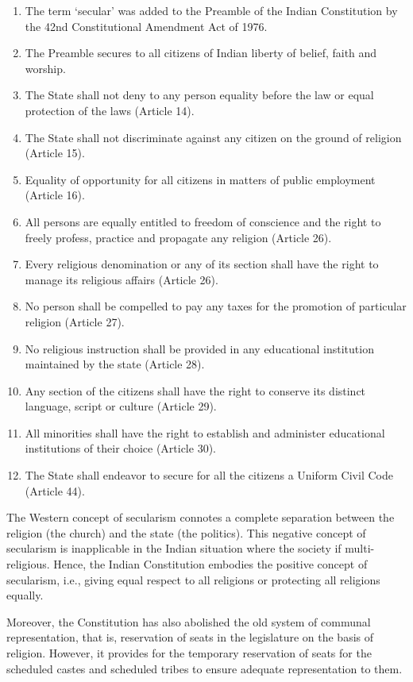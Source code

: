 \renewcommand{\labelenumi}{\textbf{(\alph{enumi})}}
\begin{enumerate}
  \item The term `secular' was added to the Preamble of the Indian Constitution by the 42nd Constitutional Amendment Act of 1976.
  \item The Preamble secures to all citizens of Indian liberty of belief, faith and worship.
  \item The State shall not deny to any person equality before the law or equal protection of the laws (Article 14).
  \item The State shall not discriminate against any citizen on the ground of religion (Article 15).
  \item Equality of opportunity for all citizens in matters of public employment (Article 16).
  \item All persons are equally entitled to freedom of conscience and the right to freely profess, practice and propagate any religion (Article 26).
  \item Every religious denomination or any of its section shall have the right to manage its religious affairs (Article 26).
  \item No person shall be compelled to pay any taxes for the promotion of particular religion (Article 27).
  \item No religious instruction shall be provided in any educational institution maintained by the state (Article 28).
  \item Any section of the citizens shall have the right to conserve its distinct language, script or culture (Article 29).
  \item All minorities shall have the right to establish and administer educational institutions of their choice (Article 30).
  \item The State shall endeavor to secure for all the citizens a Uniform Civil Code (Article 44).
\end{enumerate}

The Western concept of secularism connotes a complete separation between the religion (the church) and the state (the politics). This negative concept of secularism is inapplicable in the Indian situation where the society if multi-religious. Hence, the Indian Constitution embodies the positive concept of secularism, i.e., giving equal respect to all religions or protecting all religions equally.

Moreover, the Constitution has also abolished the old system of communal representation, that is, reservation of seats in the legislature on the basis of religion. However, it provides for the temporary reservation of seats for the scheduled castes and scheduled tribes to ensure adequate representation to them.


